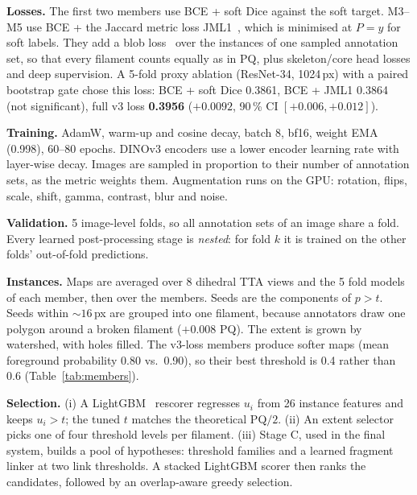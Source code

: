 \textbf{Losses.} The first two members use BCE + soft Dice against the soft target. M3--M5 use BCE + the Jaccard
metric loss JML1~\cite{wang2023jml}, which is minimised at $P=y$ for soft labels. They add a blob
loss~\cite{kofler2023blob} over the instances of one sampled annotation set, so that every filament counts
equally as in PQ, plus skeleton/core head losses and deep supervision. A 5-fold proxy ablation (ResNet-34,
1024\,px) with a paired bootstrap gate chose this loss: BCE + soft Dice 0.3861, BCE + JML1 0.3864 (not
significant), full v3 loss \textbf{0.3956} ($+0.0092$, 90\,\% CI $[+0.006,+0.012]$).

\textbf{Training.} AdamW, warm-up and cosine decay, batch 8, bf16, weight EMA (0.998), 60--80 epochs. DINOv3
encoders use a lower encoder learning rate with layer-wise decay. Images are sampled in proportion to their number
of annotation sets, as the metric weights them. Augmentation runs on the GPU: rotation, flips, scale, shift,
gamma, contrast, blur and noise.

\textbf{Validation.} 5 image-level folds, so all annotation sets of an image share a fold. Every learned
post-processing stage is \emph{nested}: for fold $k$ it is trained on the other folds' out-of-fold predictions.

\textbf{Instances.} Maps are averaged over 8 dihedral TTA views and the 5 fold models of each member, then over
the members. Seeds are the components of $p>t$. Seeds within ${\sim}16$\,px are grouped into one filament, because
annotators draw one polygon around a broken filament ($+0.008$ PQ). The extent is grown by watershed, with holes
filled. The v3-loss members produce softer maps (mean foreground probability 0.80 vs.\ 0.90), so their best
threshold is 0.4 rather than 0.6 (Table~\ref{tab:members}).

\textbf{Selection.} (i) A LightGBM~\cite{ke2017lightgbm} rescorer regresses $u_i$ from 26 instance features and
keeps $u_i>t$; the tuned $t$ matches the theoretical PQ$/2$. (ii) An extent selector picks one of four threshold
levels per filament. (iii) Stage C, used in the final system, builds a pool of hypotheses: threshold families and
a learned fragment linker at two link thresholds. A stacked LightGBM scorer then ranks the candidates, followed by
an overlap-aware greedy selection.

